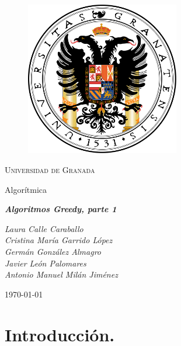 \documentclass[11pt,a4paper]{article}
\begin{document}
	\begin{titlepage}

		\centering

		\begin{figure}[h]

			\centering
			\includegraphics[width=0.6\textwidth]{logo-ugr.png}
			
		\end{figure}

		\vspace{1cm}

		{\scshape\LARGE Universidad de Granada}

		\vspace{1cm}

		{\LARGE Algorítmica}

		\vspace{1cm}

		{\huge\bfseries\textit{Algoritmos Greedy, parte 1}}

		\vspace{1cm}

		{\itshape\large 
		Laura Calle Caraballo \\
		Cristina María Garrido López \\
		Germán González Almagro \\
		Javier León Palomares \\
		Antonio Manuel Milán Jiménez}

		\vfill

		{\Large\today}

	\end{titlepage}

\newpage

	\tableofcontents

\newpage

	\section{Introducción.}
\end{document}
